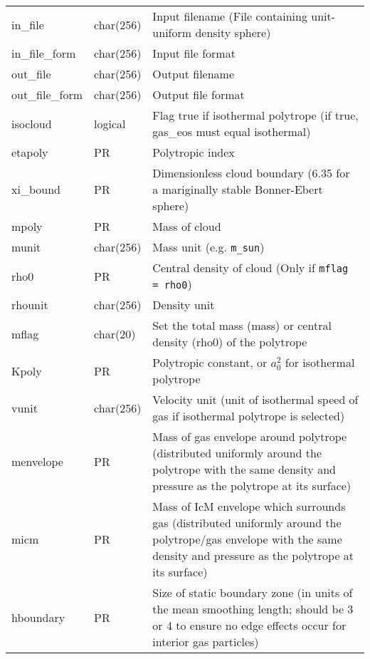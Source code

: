 \documentclass[a4paper]{article}
\newcommand{\var}[1]{\texttt{#1}}
\begin{document}
\begin{center}
\begin{supertabular}{|p{3cm}|p{2cm}|p{8cm}|}
in\_file         & char(256) & Input filename (File containing unit-uniform density sphere)\\
in\_file\_form   & char(256) & Input file format \\
out\_file        & char(256) & Output filename \\
out\_file\_form  & char(256) & Output file format \\
isocloud         & logical   & Flag true if isothermal polytrope (if true, gas\_eos must equal isothermal) \\
etapoly          & PR        & Polytropic index \\
xi\_bound        & PR        & Dimensionless cloud boundary (6.35 for a mariginally stable Bonner-Ebert sphere) \\
mpoly            & PR        & Mass of cloud \\
munit            & char(256)  & Mass unit (e.g. \var{m\_sun})\\
rho0             & PR        & Central density of cloud (Only if \var{mflag = rho0}) \\
rhounit          & char(256)  & Density unit \\
mflag            & char(20)  & Set the total mass (mass) or central density (rho0) of the polytrope \\
Kpoly            & PR        & Polytropic constant, or $a_0^2$ for isothermal polytrope \\
vunit            & char(256)  & Velocity unit (unit of isothermal speed of gas if isothermal polytrope is selected)\\
menvelope        & PR        & Mass of gas envelope around polytrope (distributed uniformly around the polytrope with the same density and pressure as the polytrope at its surface)\\
micm             & PR        & Mass of IcM envelope which surrounds gas (distributed uniformly around the polytrope/gas envelope with the same density and pressure as the polytrope at its surface)\\
hboundary        & PR        & Size of static boundary zone (in units of the mean smoothing length; should be 3 or 4 to ensure no edge effects occur for interior gas particles) \\
\end{supertabular}
\end{center}
\end{document}
